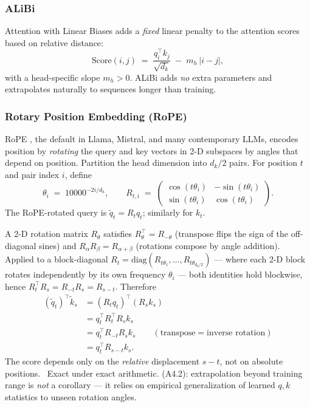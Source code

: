 \subsubsection{ALiBi}

Attention with Linear Biases \citep{press2022alibi} adds a
\emph{fixed} linear penalty to the attention scores based on relative
distance:
\begin{equation}
\label{eq:week4-alibi}
\mathrm{Score}(i, j) \;=\; \frac{q_i^{\top} k_j}{\sqrt{d_k}}
  \;-\; m_h\,|i - j|,
\end{equation}
with a head-specific slope $m_h > 0$. ALiBi adds \emph{no} extra
parameters and extrapolates naturally to sequences longer than
training.

\subsubsection{Rotary Position Embedding (RoPE)}

RoPE \citep{su2021rope}, the default in Llama, Mistral, and many
contemporary LLMs, encodes position by \emph{rotating} the query and
key vectors in 2-D subspaces by angles that depend on position.
Partition the head dimension into $d_k / 2$ pairs. For position $t$
and pair index $i$, define
\begin{equation}
\theta_i \;=\; 10000^{-2i/d_k},
\qquad
R_{t, i} \;=\; \begin{pmatrix}
\cos(t\theta_i) & -\sin(t\theta_i) \\
\sin(t\theta_i) &  \cos(t\theta_i)
\end{pmatrix}.
\end{equation}
The RoPE-rotated query is $\tilde q_t = R_t q_t$; similarly for $k_t$.

\begin{derivation}
A 2-D rotation matrix $R_\theta$ satisfies
$R_\theta^{\top} = R_{-\theta}$ (transpose flips the sign of the
off-diagonal sines) and $R_\alpha R_\beta = R_{\alpha+\beta}$
(rotations compose by angle addition). Applied to a block-diagonal
$R_t = \mathrm{diag}(R_{t\theta_1}, \dots, R_{t\theta_{d_k/2}})$ ---
where each 2-D block rotates independently by its own frequency
$\theta_i$ --- both identities hold blockwise, hence
$R_t^{\top} R_s = R_{-t} R_s = R_{s-t}$. Therefore
\begin{align}
(\tilde q_t)^{\top} \tilde k_s
&= (R_t q_t)^{\top} (R_s k_s) \\
&= q_t^{\top} R_t^{\top} R_s k_s \\
&= q_t^{\top} R_{-t} R_s k_s
  \qquad (\text{transpose} = \text{inverse rotation}) \\
&= q_t^{\top} R_{s-t} k_s.
\label{eq:week4-rope-relative}
\end{align}
The score depends only on the \emph{relative} displacement
$s - t$, not on absolute positions. \Ident\ Exact under exact
arithmetic. (A4.2): extrapolation beyond training range is
\emph{not} a corollary --- it relies on empirical generalization of
learned $q, k$ statistics to unseen rotation angles.
\end{derivation}

